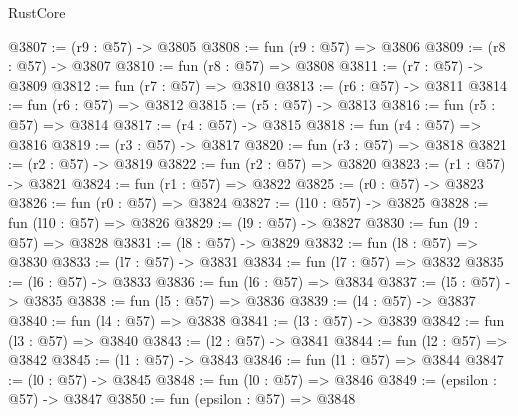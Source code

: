 \begin{lexlean}{RustCore}
\begin{coremodule}
@3807 := (r9 : @57) -> @3805
@3808 := fun (r9 : @57) => @3806
@3809 := (r8 : @57) -> @3807
@3810 := fun (r8 : @57) => @3808
@3811 := (r7 : @57) -> @3809
@3812 := fun (r7 : @57) => @3810
@3813 := (r6 : @57) -> @3811
@3814 := fun (r6 : @57) => @3812
@3815 := (r5 : @57) -> @3813
@3816 := fun (r5 : @57) => @3814
@3817 := (r4 : @57) -> @3815
@3818 := fun (r4 : @57) => @3816
@3819 := (r3 : @57) -> @3817
@3820 := fun (r3 : @57) => @3818
@3821 := (r2 : @57) -> @3819
@3822 := fun (r2 : @57) => @3820
@3823 := (r1 : @57) -> @3821
@3824 := fun (r1 : @57) => @3822
@3825 := (r0 : @57) -> @3823
@3826 := fun (r0 : @57) => @3824
@3827 := (l10 : @57) -> @3825
@3828 := fun (l10 : @57) => @3826
@3829 := (l9 : @57) -> @3827
@3830 := fun (l9 : @57) => @3828
@3831 := (l8 : @57) -> @3829
@3832 := fun (l8 : @57) => @3830
@3833 := (l7 : @57) -> @3831
@3834 := fun (l7 : @57) => @3832
@3835 := (l6 : @57) -> @3833
@3836 := fun (l6 : @57) => @3834
@3837 := (l5 : @57) -> @3835
@3838 := fun (l5 : @57) => @3836
@3839 := (l4 : @57) -> @3837
@3840 := fun (l4 : @57) => @3838
@3841 := (l3 : @57) -> @3839
@3842 := fun (l3 : @57) => @3840
@3843 := (l2 : @57) -> @3841
@3844 := fun (l2 : @57) => @3842
@3845 := (l1 : @57) -> @3843
@3846 := fun (l1 : @57) => @3844
@3847 := (l0 : @57) -> @3845
@3848 := fun (l0 : @57) => @3846
@3849 := (epsilon : @57) -> @3847
@3850 := fun (epsilon : @57) => @3848
\end{coremodule}
\end{lexlean}
